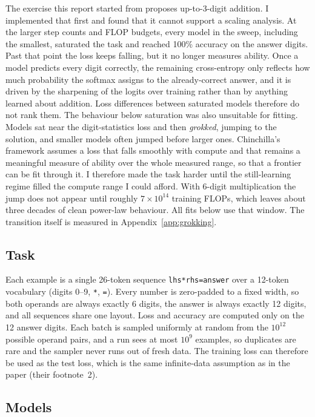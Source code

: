 \documentclass[10pt]{article}
\newcommand{\e}[1]{\times 10^{#1}}
\begin{document}
The exercise this report started from proposes up-to-3-digit addition. I
implemented that first and found that it cannot support a scaling analysis.
At the larger step counts and FLOP budgets, every model in the sweep,
including the smallest, saturated the task and reached 100\% accuracy on the
answer digits. Past that point the loss keeps falling, but it no longer
measures ability. Once a model predicts every digit correctly, the remaining
cross-entropy only reflects how much probability the softmax assigns to the
already-correct answer, and it is driven by the sharpening of the logits
over training rather than by anything learned about addition. Loss differences between saturated models therefore do not rank them. The
behaviour below saturation was also unsuitable for fitting. Models sat near the
digit-statistics loss and then \emph{grokked}, jumping to the solution, and
smaller models often jumped before larger ones. Chinchilla's framework
assumes a loss that falls smoothly with compute and that remains a
meaningful measure of ability over the whole measured range, so that a
frontier can be fit through it. I therefore made
the task harder until the still-learning regime filled the compute range I
could afford. With 6-digit multiplication the jump does not appear until
roughly $7\e{14}$ training FLOPs, which leaves about three decades of clean
power-law behaviour. All fits below use that window. The transition itself
is measured in Appendix~\ref{app:grokking}.

\subsection{Task}

Each example is a single 26-token sequence \texttt{lhs*rhs=answer} over a
12-token vocabulary (digits 0--9, \texttt{*}, \texttt{=}). Every number is
zero-padded to a fixed width, so both operands are always exactly 6 digits,
the answer is always exactly 12 digits, and all sequences share one layout.
Loss and accuracy are computed only on the 12 answer digits. Each batch is
sampled uniformly at random from the $10^{12}$ possible operand pairs, and a
run sees at most $10^{9}$ examples, so duplicates are rare and the sampler
never runs out of fresh data. The training loss can therefore be used as the
test loss, which is the same infinite-data assumption as in the paper (their
footnote~2).

\subsection{Models}
\end{document}
